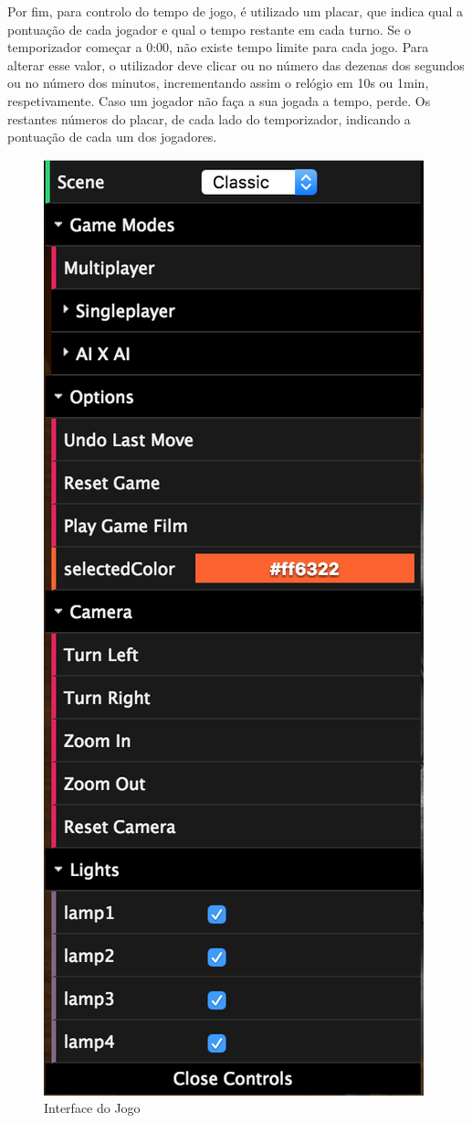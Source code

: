 \documentclass[a4paper]{article}
\begin{document}
Por fim, para controlo do tempo de jogo, é utilizado um placar, que indica qual a pontuação de cada jogador e qual o tempo restante em cada turno. Se o temporizador começar a 0:00, não existe tempo limite para cada jogo. Para alterar esse valor, o utilizador deve clicar ou no número das dezenas dos segundos ou no número dos minutos, incrementando assim o relógio em 10s ou 1min, respetivamente. Caso um jogador não faça a sua jogada a tempo, perde. Os restantes números do placar, de cada lado do temporizador, indicando a pontuação de cada um dos jogadores.

\begin{figure}[p]
\begin{center}
\includegraphics[scale=0.5]{images/interface.png}
\caption{Interface do Jogo}
\end{center}
\end{figure}
\end{document}
